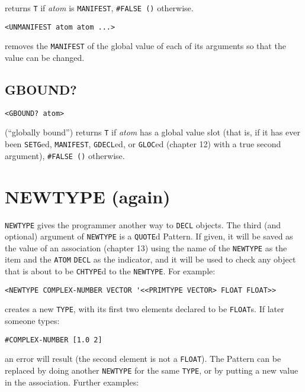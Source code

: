 \documentclass[a4paper]{scrbook}
\begin{document}
 returns \texttt{T} if \emph{atom} is \texttt{MANIFEST}, \texttt{\#FALSE\ ()} otherwise.

\begin{verbatim}
<UNMANIFEST atom atom ...>
\end{verbatim}

 removes the \texttt{MANIFEST} of the global value of each of its arguments so that the
value can be changed.

\subsection{GBOUND?}\label{gbound}

\begin{verbatim}
<GBOUND? atom>
\end{verbatim}

 (``globally bound'') returns \texttt{T} if \emph{atom} has a global value slot (that is, if
it has ever been \texttt{SETG}ed, \texttt{MANIFEST}, \texttt{GDECL}ed, or \texttt{GLOC}ed (chapter 12) with a true second
argument), \texttt{\#FALSE\ ()} otherwise.

\section{NEWTYPE (again)}\label{newtype-again}

 \texttt{NEWTYPE} gives the programmer another way to \texttt{DECL} objects. The third (and
optional) argument of \texttt{NEWTYPE} is a \texttt{QUOTE}d Pattern. If given, it will be saved as the value of an
association (chapter 13) using the name of the \texttt{NEWTYPE} as the item and the \texttt{ATOM} \texttt{DECL} as the
indicator, and it will be used to check any object that is about to be \texttt{CHTYPE}d to the \texttt{NEWTYPE}. For
example:

\begin{verbatim}
<NEWTYPE COMPLEX-NUMBER VECTOR '<<PRIMTYPE VECTOR> FLOAT FLOAT>>
\end{verbatim}

creates a new \texttt{TYPE}, with its first two elements declared to be \texttt{FLOAT}s. If later someone types:

\begin{verbatim}
#COMPLEX-NUMBER [1.0 2]
\end{verbatim}

an error will result (the second element is not a \texttt{FLOAT}). The Pattern can be replaced by doing another
\texttt{NEWTYPE} for the same \texttt{TYPE}, or by putting a new value in the association. Further examples:
\end{document}
